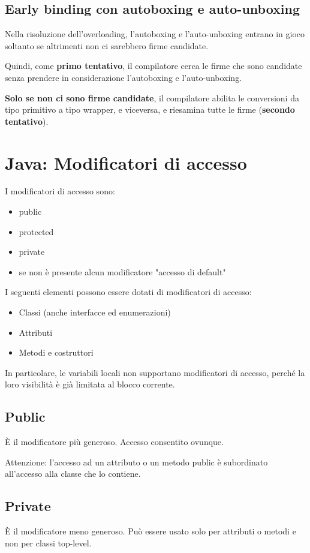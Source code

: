 \documentclass[10pt]{article}
\begin{document}
\subsection{Early binding con autoboxing e auto-unboxing}
Nella risoluzione dell'overloading, l'autoboxing e l'auto-unboxing entrano in gioco soltanto se altrimenti non ci sarebbero firme candidate.

Quindi, come \textbf{primo tentativo}, il compilatore cerca le firme che sono candidate senza 
prendere in considerazione l'autoboxing e l'auto-unboxing.

\textbf{Solo se non ci sono firme candidate}, il compilatore abilita le conversioni da tipo 
primitivo a tipo wrapper, e viceversa, e riesamina tutte le firme (\textbf{secondo tentativo}).

\section{Java: Modificatori di accesso}
I modificatori di accesso sono:
\begin{itemize}
    \item public
    \item protected
    \item private
    \item se non è presente alcun modificatore "accesso di default"
\end{itemize}
I seguenti elementi possono essere dotati di modificatori di accesso:
\begin{itemize}
    \item Classi (anche interfacce ed enumerazioni)
    \item Attributi
    \item Metodi e costruttori
\end{itemize}
In particolare, le variabili locali non supportano modificatori di accesso, perché la loro visibilità è già limitata al blocco corrente.
\subsection{Public}
È il modificatore più generoso. Accesso consentito ovunque.

Attenzione: l’accesso ad un attributo o un metodo public è subordinato all’accesso alla classe che lo contiene.
\subsection{Private}
È il modificatore meno generoso. Può essere usato solo per attributi o metodi e non per classi top-level.
\end{document}
